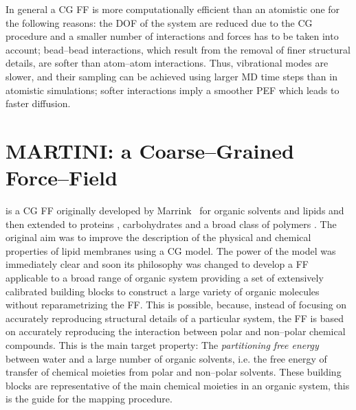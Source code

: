 In general a \ac{CG} \ac{FF} is more computationally efficient than an atomistic one for the following reasons: the \ac{DOF} of the system are reduced due to the \ac{CG} procedure and a smaller number of interactions and forces has to be taken into account; bead--bead interactions, which result from the removal of finer structural details, are softer than atom--atom interactions. Thus, vibrational modes are slower, and their sampling can be achieved using larger \ac{MD} time steps than in atomistic simulations; softer interactions imply a smoother \ac{PEF} which leads to faster diffusion.

\section{MARTINI: a Coarse--Grained Force--Field}
\martini is a \ac{CG} \ac{FF} originally developed by Marrink \etal\, \cite{Martini} for organic solvents and lipids and then extended to proteins \cite{MartiniProtein}, carbohydrates \cite{MartiniCarbo} and a broad class of polymers \cite{MartiniPolymers}. The original aim was to improve the description of the physical and chemical properties of lipid membranes using a \ac{CG} model. The power of the model was immediately clear and soon its philosophy was changed to develop a \ac{FF} applicable to a broad range of organic system providing a set of extensively calibrated building blocks to construct a large variety of organic molecules without reparametrizing the \ac{FF}. This is possible, because, instead of focusing on accurately reproducing structural details of a particular system, the \ac{FF} is based on accurately reproducing the interaction between polar and non--polar chemical compounds. This is the main target property: The \textit{partitioning free energy} between water and a large number of organic solvents, i.e. the free energy of transfer of chemical moieties from polar and non--polar solvents. These building blocks are representative of the main chemical moieties in an organic system, this is the guide for the mapping procedure.


